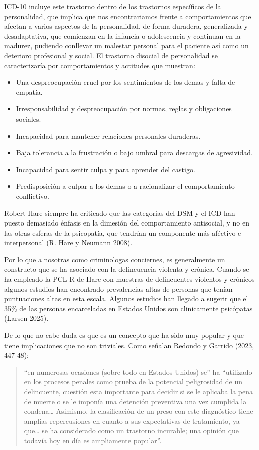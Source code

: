 \documentclass[
  spanish,
  letterpaper,
  DIV=11,
  numbers=noendperiod]{scrreprt}
\begin{document}
ICD-10 incluye este trastorno dentro de los trastornos específicos de la
personalidad, que implica que nos encontrariamos frente a
comportamientos que afectan a varios aspectos de la personalidad, de
forma duradera, generalizada y desadaptativa, que comienzan en la
infancia o adolescencia y continuan en la madurez, pudiendo conllevar un
malestar personal para el paciente así como un deterioro profesional y
social. El trastorno disocial de personalidad se caracterizaría por
comportamientos y actitudes que muestran:

\begin{itemize}
\item
  Una despreocupación cruel por los sentimientos de los demas y falta de
  empatía.
\item
  Irresponsabilidad y despreocupación por normas, reglas y obligaciones
  sociales.
\item
  Incapacidad para mantener relaciones personales duraderas.
\item
  Baja tolerancia a la frustración o bajo umbral para descargas de
  agresividad.
\item
  Incapacidad para sentir culpa y para aprender del castigo.
\item
  Predisposición a culpar a los demas o a racionalizar el comportamiento
  conflictivo.
\end{itemize}

Robert Hare siempre ha criticado que las categorias del DSM y el ICD han
puesto demasiado énfasis en la dimesión del comportamiento antisocial, y
no en las otras esferas de la psicopatía, que tendrían un componente más
aféctivo e interpersonal (R. Hare y Neumann 2008).

Por lo que a nosotras como criminologas conciernes, es generalmente un
constructo que se ha asociado con la delincuencia violenta y crónica.
Cuando se ha empleado la PCL-R de Hare con muestras de delincuentes
violentos y crónicos algunos estudios han encontrado prevalencias altas
de personas que tenían puntuaciones altas en esta escala. Algunos
estudios han llegado a sugerir que el 35\% de las personas encarceladas
en Estados Unidos son clinicamente psicópatas (Larsen 2025).

De lo que no cabe duda es que es un concepto que ha sido muy popular y
que tiene implicaciones que no son triviales. Como señalan Redondo y
Garrido (2023, 447-48):

\begin{quote}
``en numerosas ocasiones (sobre todo en Estados Unidos) se'' ha
``utilizado en los procesos penales como prueba de la potencial
peligrosidad de un delincuente, cuestión esta importante para decidir si
se le aplicaba la pena de muerte o se le imponía una detención
preventiva una vez cumplida la condena\ldots{} Asimismo, la
clasificación de un preso con este diagnóstico tiene amplias
repercusiones en cuanto a sus expectativas de tratamiento, ya
que\ldots{} se ha considerado como un trastorno incurable; una opinión
que todavía hoy en día es ampliamente popular''.
\end{quote}
\end{document}
